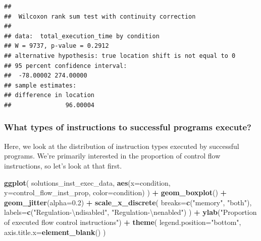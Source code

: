\documentclass[]{book}
\newenvironment{Shaded}{\begin{snugshade}}{\end{snugshade}}
\newcommand{\CharTok}[1]{\textcolor[rgb]{0.31,0.60,0.02}{#1}}
\newcommand{\DataTypeTok}[1]{\textcolor[rgb]{0.13,0.29,0.53}{#1}}
\newcommand{\FloatTok}[1]{\textcolor[rgb]{0.00,0.00,0.81}{#1}}
\newcommand{\KeywordTok}[1]{\textcolor[rgb]{0.13,0.29,0.53}{\textbf{#1}}}
\newcommand{\NormalTok}[1]{#1}
\newcommand{\OperatorTok}[1]{\textcolor[rgb]{0.81,0.36,0.00}{\textbf{#1}}}
\newcommand{\StringTok}[1]{\textcolor[rgb]{0.31,0.60,0.02}{#1}}
\begin{document}
\begin{verbatim}
## 
##  Wilcoxon rank sum test with continuity correction
## 
## data:  total_execution_time by condition
## W = 9737, p-value = 0.2912
## alternative hypothesis: true location shift is not equal to 0
## 95 percent confidence interval:
##  -78.00002 274.00000
## sample estimates:
## difference in location 
##               96.00004
\end{verbatim}

\hypertarget{what-types-of-instructions-to-successful-programs-execute-2}{%
\subsubsection{What types of instructions to successful programs execute?}\label{what-types-of-instructions-to-successful-programs-execute-2}}

Here, we look at the distribution of instruction types executed by successful programs.
We're primarily interested in the proportion of control flow instructions, so let's look at that first.

\begin{Shaded}
\begin{Highlighting}[]
\KeywordTok{ggplot}\NormalTok{( solutions_inst_exec_data, }\KeywordTok{aes}\NormalTok{(}\DataTypeTok{x=}\NormalTok{condition, }\DataTypeTok{y=}\NormalTok{control_flow_inst_prop, }\DataTypeTok{color=}\NormalTok{condition) ) }\OperatorTok{+}
\StringTok{  }\KeywordTok{geom_boxplot}\NormalTok{() }\OperatorTok{+}
\StringTok{  }\KeywordTok{geom_jitter}\NormalTok{(}\DataTypeTok{alpha=}\FloatTok{0.2}\NormalTok{) }\OperatorTok{+}
\StringTok{  }\KeywordTok{scale_x_discrete}\NormalTok{(}
    \DataTypeTok{breaks=}\KeywordTok{c}\NormalTok{(}\StringTok{"memory"}\NormalTok{, }\StringTok{"both"}\NormalTok{),}
    \DataTypeTok{labels=}\KeywordTok{c}\NormalTok{(}\StringTok{"Regulation-}\CharTok{\textbackslash{}n}\StringTok{disabled"}\NormalTok{, }\StringTok{"Regulation-}\CharTok{\textbackslash{}n}\StringTok{enabled"}\NormalTok{)}
\NormalTok{  ) }\OperatorTok{+}
\StringTok{  }\KeywordTok{ylab}\NormalTok{(}\StringTok{"Proportion of executed flow control instructions"}\NormalTok{) }\OperatorTok{+}
\StringTok{  }\KeywordTok{theme}\NormalTok{(}
    \DataTypeTok{legend.position=}\StringTok{"bottom"}\NormalTok{,}
    \DataTypeTok{axis.title.x=}\KeywordTok{element_blank}\NormalTok{()}
\NormalTok{  )}
\end{Highlighting}
\end{Shaded}
\end{document}

